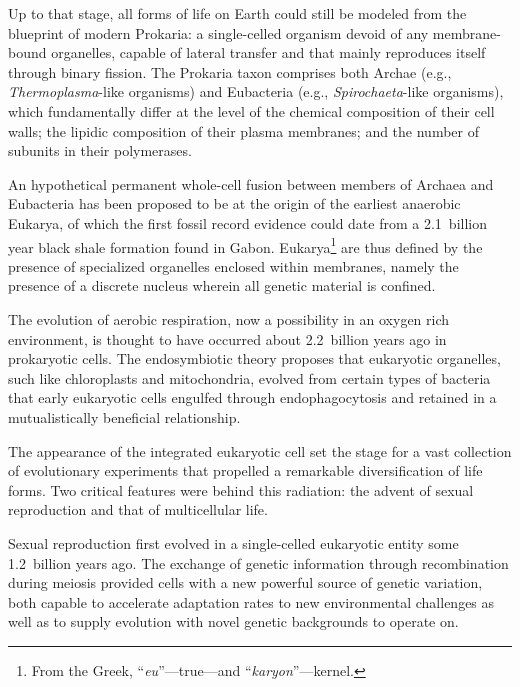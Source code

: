 

Up to that stage, all forms of life on Earth could still be modeled from the
blueprint of modern Prokaria: a \mbox{single-celled} organism devoid of any
\mbox{membrane-bound} organelles, capable of lateral  transfer and
that mainly reproduces itself through binary fission.  The Prokaria taxon
comprises both Archae (e.g., \mbox{\emph{Thermoplasma}-like} organisms) and
Eubacteria (e.g., \mbox{\emph{Spirochaeta}-like} organisms), which fundamentally
differ at the level of the chemical composition of their cell walls; the lipidic
composition of their plasma membranes; and the number of subunits in their
 polymerases.

An hypothetical permanent \mbox{whole-cell} fusion between members of Archaea
and Eubacteria has been proposed to be at the origin of the earliest anaerobic
Eukarya,\cite{margulis_archaeal-eubacterial_1996} of which the first fossil
record evidence could date from a 2.1~billion year black shale formation found
in Gabon.\cite{albani_large_2010} Eukarya\footnote{From the Greek,
  ``\emph{eu}''---true---and ``\emph{karyon}''---kernel.} are thus defined by
the presence of specialized organelles enclosed within membranes, namely the
presence of a discrete nucleus wherein all genetic material is confined.

The evolution of aerobic respiration, now a possibility in an oxygen rich
environment, is thought to have occurred about 2.2~billion years ago in
prokaryotic cells.  The endosymbiotic theory proposes that eukaryotic
organelles, such like chloroplasts and mitochondria, evolved from certain types
of bacteria that early eukaryotic cells engulfed through endophagocytosis and
retained in a mutualistically beneficial relationship.

The appearance of the integrated eukaryotic cell set the stage for a vast
collection of evolutionary experiments that propelled a remarkable
diversification of life forms.  Two critical features were behind this
radiation: the advent of sexual reproduction and that of multicellular life.

Sexual reproduction first evolved in a \mbox{single-celled} eukaryotic entity
some 1.2~billion years ago.\cite{bernstein_dna_2012} The exchange of genetic
information through recombination during meiosis provided cells with a new
powerful source of genetic variation, both capable to accelerate adaptation
rates to new environmental challenges as well as to supply evolution with novel
genetic backgrounds to operate on.\cite{burt_perspective:_2000}

